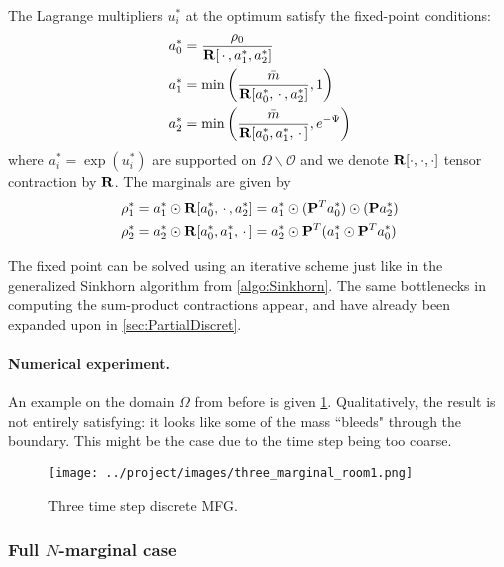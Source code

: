 \documentclass[../report.tex]{subfiles}
\begin{document}
\begin{prop}
The Lagrange multipliers $u_i^*$ at the optimum satisfy the fixed-point conditions:
\begin{align*}
	&a_0^* = \frac{\rho_0}{\mathbf{R}[\,\cdot\,, a_1^*, a_2^*]} \\
	&a_1^* = \min\left(
	\frac{\bar{m}}{\mathbf{R}[a_0^*, \,\cdot\,, a_2^*]}, 1\right) \\
	&a_2^* = \min\left(
	\frac{\bar{m}}{\mathbf{R}[a_0^*, a_1^*, \,\cdot\,]}, e^{-\Psi}
	\right)
\end{align*}
where $a_i^* = \exp(u_i^*)$ are supported on $\Omega\backslash\mathscr{O}$ and we denote $\mathbf{R}[\cdot,\cdot,\cdot]$ tensor contraction by $\mathbf{R}$.
The marginals are given by
\[
\begin{aligned}
	\rho_1^* &=
	a_1^* \odot
	\mathbf{R}[a_0^*, \,\cdot\,, a_2^*] =
	a_1^* \odot
	(\mathbf{P}^Ta_0^*) \odot
	(\mathbf{P}a_2^*) \\
	\rho_2^* &= 
	a_2^* \odot \mathbf{R}[a_0^*, a_1^*, \,\cdot\,]
	= a_2^* \odot
	\mathbf{P}^T
	(a_1^* \odot \mathbf{P}^Ta_0^*)
\end{aligned}
\]
\end{prop}



The fixed point can be solved using an iterative scheme just like in the generalized Sinkhorn algorithm from \cref{algo:Sinkhorn}.
The same bottlenecks in computing the sum-product contractions appear, and have already been expanded upon in \cref{sec:PartialDiscret}.

\paragraph{Numerical experiment.} An example on the domain $\Omega$ from before is given \cref{fig:3MargTransport}. Qualitatively, the result is not entirely satisfying: it looks like some of the mass ``bleeds" through the boundary. This might be the case due to the time step being too coarse.

\begin{figure}[h]
	\centering
	\texttt{[image: ../project/images/three\_marginal\_room1.png]}
	\caption{Three time step discrete MFG.}\label{fig:3MargTransport}
\end{figure}


\subsubsection{Full $N$-marginal case}
\end{document}
